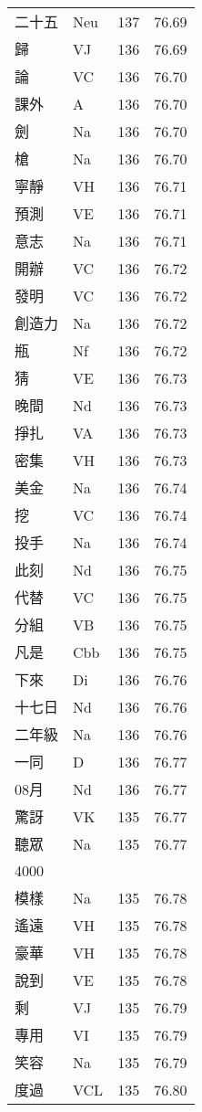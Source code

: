 \documentclass[twocolumn]{book}
\begin{document}
\begin{supertabular}{llrr}
二十五 & Neu & 137 &  76.69\\
歸 & VJ & 136 &  76.69\\
論 & VC & 136 &  76.70\\
課外 & A & 136 &  76.70\\
劍 & Na & 136 &  76.70\\
槍 & Na & 136 &  76.70\\
寧靜 & VH & 136 &  76.71\\
預測 & VE & 136 &  76.71\\
意志 & Na & 136 &  76.71\\
開辦 & VC & 136 &  76.72\\
發明 & VC & 136 &  76.72\\
創造力 & Na & 136 &  76.72\\
瓶 & Nf & 136 &  76.72\\
猜 & VE & 136 &  76.73\\
晚間 & Nd & 136 &  76.73\\
掙扎 & VA & 136 &  76.73\\
密集 & VH & 136 &  76.73\\
美金 & Na & 136 &  76.74\\
挖 & VC & 136 &  76.74\\
投手 & Na & 136 &  76.74\\
此刻 & Nd & 136 &  76.75\\
代替 & VC & 136 &  76.75\\
分組 & VB & 136 &  76.75\\
凡是 & Cbb & 136 &  76.75\\
下來 & Di & 136 &  76.76\\
十七日 & Nd & 136 &  76.76\\
二年級 & Na & 136 &  76.76\\
一同 & D & 136 &  76.77\\
08月 & Nd & 136 &  76.77\\
驚訝 & VK & 135 &  76.77\\
聽眾 & Na & 135 &  76.77\\
4000\\
模樣 & Na & 135 &  76.78\\
遙遠 & VH & 135 &  76.78\\
豪華 & VH & 135 &  76.78\\
說到 & VE & 135 &  76.78\\
剩 & VJ & 135 &  76.79\\
專用 & VI & 135 &  76.79\\
笑容 & Na & 135 &  76.79\\
度過 & VCL & 135 &  76.80\\

\end{supertabular}
\end{document}
